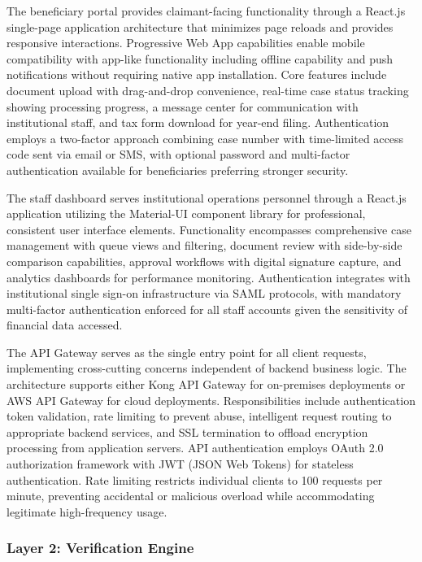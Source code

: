 The beneficiary portal provides claimant-facing functionality through a React.js single-page application architecture that minimizes page reloads and provides responsive interactions. Progressive Web App capabilities enable mobile compatibility with app-like functionality including offline capability and push notifications without requiring native app installation. Core features include document upload with drag-and-drop convenience, real-time case status tracking showing processing progress, a message center for communication with institutional staff, and tax form download for year-end filing. Authentication employs a two-factor approach combining case number with time-limited access code sent via email or SMS, with optional password and multi-factor authentication available for beneficiaries preferring stronger security.

The staff dashboard serves institutional operations personnel through a React.js application utilizing the Material-UI component library for professional, consistent user interface elements. Functionality encompasses comprehensive case management with queue views and filtering, document review with side-by-side comparison capabilities, approval workflows with digital signature capture, and analytics dashboards for performance monitoring. Authentication integrates with institutional single sign-on infrastructure via SAML protocols, with mandatory multi-factor authentication enforced for all staff accounts given the sensitivity of financial data accessed.

The API Gateway serves as the single entry point for all client requests, implementing cross-cutting concerns independent of backend business logic. The architecture supports either Kong API Gateway for on-premises deployments or AWS API Gateway for cloud deployments. Responsibilities include authentication token validation, rate limiting to prevent abuse, intelligent request routing to appropriate backend services, and SSL termination to offload encryption processing from application servers. API authentication employs OAuth 2.0 authorization framework with JWT (JSON Web Tokens) for stateless authentication. Rate limiting restricts individual clients to 100 requests per minute, preventing accidental or malicious overload while accommodating legitimate high-frequency usage.

\subsubsection{Layer 2: Verification Engine}

